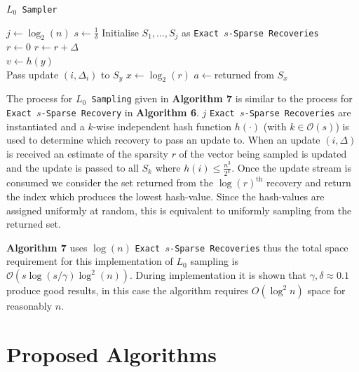 \documentclass[11pt,twoside,a4paper]{report}
\begin{document}
\begin{algorithm}
	\caption{\texttt{$L_0$ Sampler}}
	$j\leftarrow\log_2(n)$
	$s\leftarrow\frac1\delta$
	Initialise $S_1,\dots,S_j$ as \texttt{Exact $s$-Sparse Recoveries}\\
	$r\leftarrow0$
	 {
		$r\leftarrow r+\Delta$\\
		 {
			$v\leftarrow h(y)$\\
			 {Pass update $(i,\Delta_i)$ to $S_y$}
		}
	}
	$x\leftarrow\log_2(r)$
	$a\leftarrow$returned from $S_x$
\end{algorithm}

The process for \texttt{$L_0$ Sampling} given in \textbf{Algorithm 7} is similar to the process for \texttt{Exact $s$-Sparse Recovery} in \textbf{Algorithm 6}. $j$ \texttt{Exact $s$-Sparse Recoveries} are instantiated and a $k$-wise independent hash function $h(\cdot)$ (with $k\in\mathcal{O}(s)$) is used to determine which recovery to pass an update to. When an update $(i,\Delta)$ is received an estimate of the sparsity $r$ of the vector being sampled is updated and the update is passed to all $S_k$ where $h(i)\leq\frac{n^3}{2^k}$. Once the update stream is consumed we consider the set returned from the $\log(r)^\text{th}$ recovery and return the index which produces the lowest hash-value. Since the hash-values are assigned uniformly at random, this is equivalent to uniformly sampling from the returned set.

\par \textbf{Algorithm 7} uses $\log(n)$ \texttt{Exact $s$-Sparse Recoveries} thus the total space requirement for this implementation of $L_0$ sampling is $\mathcal{O}(s\log(s/\gamma)\log^2(n))$. During implementation it is shown that $\gamma,\delta\approx0.1$ produce good results, in this case the algorithm requires $O(\log^2 n)$ space for reasonably $n$.

\section{Proposed Algorithms}
\end{document}
